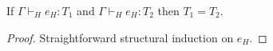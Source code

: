 \begin{huot}
\label{huot}
If $\Gamma\vdash_{H}e_{H}:T_{1}$ and $\Gamma\vdash_{H}e_{H}:T_{2}$ then $T_{1}=T_{2}$.
\begin{proof}
Straightforward structural induction on $e_{H}$.
\end{proof}
\end{huot}